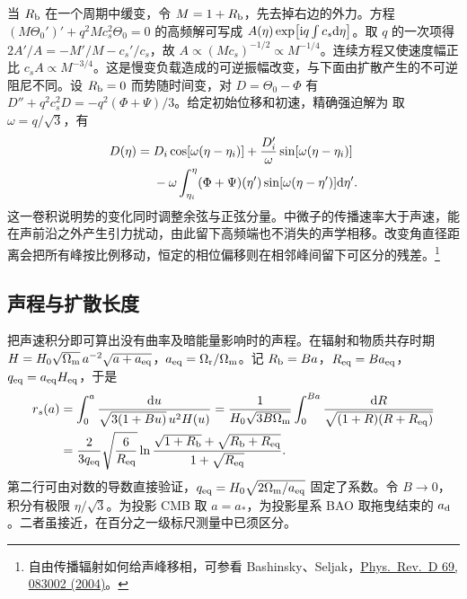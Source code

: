 当 $R_{\rm b}$ 在一个周期中缓变，令 $M=1+R_{\rm b}$，先去掉右边的外力。方程 $(M\Theta_0')'+q^2 M c_s^2\Theta_0=0$ 的高频解可写成 $A(\eta)\exp[\mathrm{i} q\int c_s\dd\eta]$。取 $q$ 的一次项得 $2A'/A=-M'/M-c_s'/c_s$，故 $A\propto(Mc_s)^{-1/2}\propto M^{-1/4}$。连续方程又使速度幅正比 $c_s A\propto M^{-3/4}$。这是慢变负载造成的可逆振幅改变，与下面由扩散产生的不可逆阻尼不同。设 $R_{\rm b}=0$ 而势随时间变，对 $D=\Theta_0-\Phi$ 有 $D''+q^2 c_s^2D=-q^2(\Phi+\Psi)/3$。给定初始位移和初速，精确强迫解为
取 $\omega=q/\sqrt3$，有
\[
 \begin{aligned}
 D(\eta)={}&D_i\cos[\omega(\eta-\eta_i)]
  +\frac{D_i'}{\omega}\sin[\omega(\eta-\eta_i)]\\
  &-\omega\int_{\eta_i}^\eta(\Phi+\Psi)(\eta')
                  \sin[\omega(\eta-\eta')]\dd\eta'.
 \end{aligned}
\]
这一卷积说明势的变化同时调整余弦与正弦分量。中微子的传播速率大于声速，能在声前沿之外产生引力扰动，由此留下高频端也不消失的声学相移。改变角直径距离会把所有峰按比例移动，恒定的相位偏移则在相邻峰间留下可区分的残差。\footnote{自由传播辐射如何给声峰移相，可参看 Bashinsky、Seljak，\href{https://doi.org/10.1103/PhysRevD.69.083002}{Phys.\ Rev.\ D 69, 083002 (2004)}。}

\subsection{声程与扩散长度}

把声速积分即可算出没有曲率及暗能量影响时的声程。在辐射和物质共存时期 $H=H_0\sqrt{\Omega_{\rm m}}\,a^{-2}\sqrt{a+a_{\rm eq}}$，$a_{\rm eq}=\Omega_{\rm r}/\Omega_{\rm m}$。记 $R_{\rm b}=B a$，$R_{\rm eq}=B a_{\rm eq}$，$q_{\rm eq}=a_{\rm eq} H_{\rm eq}$，于是
\begin{align*}
 r_s(a)&=\int_0^a\frac{\dd u}{\sqrt{3(1+Bu)}\,u^2H(u)}
 =\frac{1}{H_0\sqrt{3 B\Omega_{\rm m}}}
   \int_0^{Ba}\frac{\dd R}{\sqrt{(1+R)(R+R_{\rm eq})}}\\
 &=\frac{2}{3q_{\rm eq}}\sqrt{\frac{6}{R_{\rm eq}}}
    \ln\frac{\sqrt{1+R_{\rm b}}+\sqrt{R_{\rm b}+R_{\rm eq}}}
             {1+\sqrt{R_{\rm eq}}}.
\end{align*}
第二行可由对数的导数直接验证，$q_{\rm eq}=H_0\sqrt{2\Omega_{\rm m}/a_{\rm eq}}$ 固定了系数。令 $B\to0$，积分有极限 $\eta/\sqrt3$。为投影 CMB 取 $a=a_*$，为投影星系 BAO 取拖曳结束的 $a_{\rm d}$。二者虽接近，在百分之一级标尺测量中已须区分。

